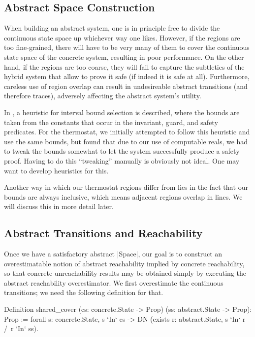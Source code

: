 \documentclass[runningheads]{llncs}
\begin{document}
\subsection{Abstract Space Construction}
\label{abs.space.constr}

When building an abstract system, one is in principle free to divide
the continuous state space up whichever way one likes. However, if the
regions are too fine-grained, there will have to be very many of them
to cover the continuous state space of the concrete system, resulting
in poor performance. On the other hand, if the regions are too coarse,
they will fail to capture the subtleties of the hybrid system that
allow to prove it safe (if indeed it is safe at all).  Furthermore,
careless use of region overlap can result in undesireable abstract
transitions (and therefore traces), adversely affecting the abstract
system's utility.

In \cite{alur}, a heuristic for interval bound selection is described,
where the bounds are taken from the constants that occur in the
invariant, guard, and safety predicates. For the thermostat, we
initially attempted to follow this heuristic and use the same bounds,
but found that due to our use of computable reals, we had to tweak the
bounds somewhat to let the system successfully produce a safety
proof. 
Having to do this ``tweaking'' manually is obviously not ideal. One may want to develop heuristics for this.


Another way in which our thermostat regions differ from \cite{alur}
lies in the fact that our bounds are always inclusive, which means
adjacent regions overlap in lines. We will discuss this in more detail
later.

\subsection{Abstract Transitions and Reachability}
\label{abs.reach}
Once we have a satisfactory abstract |Space|, our goal is to construct
an overestimatable notion of abstract reachability implied by concrete
reachability, so that concrete unreachability results may be obtained
simply by executing the abstract reachability overestimator. We first overestimate the continuous transitions; we need the following definition for that.

\begin{code}
  Definition shared_cover
    (cs: concrete.State -> Prop) (ss: abstract.State -> Prop): Prop :=
        forall s: concrete.State, s `In` cs -> DN (exists r: abstract.State, s `In` r /\ r `In` ss).
\end{code}
\end{document}
